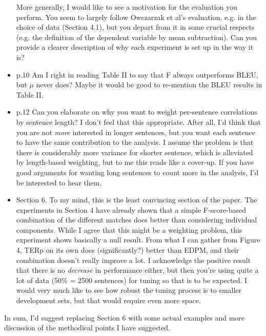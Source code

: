 \documentclass[letterpaper,12pt]{article}
\begin{document}
\begin{itemize}
  More generally, I would like to see a motivation for the evaluation
  you perform. You seem to largely follow Owczarzak et al's
  evaluation, e.g. in the choice of data (Section 4.1), but you depart
  from it in some crucial respects (e.g. the definition of the
  dependent variable by mean subtraction). Can you provide a clearer
  description of why each experiment is set up in the way it is?

\item  p.10 Am I right in reading Table II to say that F always
  outperforms BLEU, but $\mu$ never does? Maybe it would be good to
  re-mention the BLEU results in Table II.

\item  p.12 Can you elaborate on why you want to weight per-sentence
  correlations by sentence length? I don't feel that this
  appropriate. After all, I'd think that you are not \emph{more}
  interested in longer sentences, but you want each sentence to have
  the same contribution to the analysis. I assume the problem is that
  there is considerably more variance for shorter sentence, which is
  alleviated by length-based weighting, but to me this reads like a
  cover-up. If you have good arguments for wanting long sentences to
  count more in the analysis, I'd be interested to hear them.

\item  Section 6. To my mind, this is the least convincing section of the
  paper. The experiments in Section 4 have already shown that a simple
  F-score-based combination of the different matches does better than
  considering individual components. While I agree that this might be
  a weighting problem, this experiment shows basically a null result.
  From what I can gather from Figure 4, TERp on its own does
  (significantly?) better than EDPM, and their combination doesn't
  really improve a lot. I acknowledge the positive result that there
  is no \emph{decrease} in performance either, but then you're using
  quite a lot of data (50\% = 2500 sentences) for tuning so that is to
  be expected. I would very much like to see how robust the tuning
  process is to smaller development sets, but that would require even
  more space.
\end{itemize}
 In sum, I'd suggest replacing Section 6 with some actual examples
 and more discussion of the methodical points I have suggested.
\end{document}
